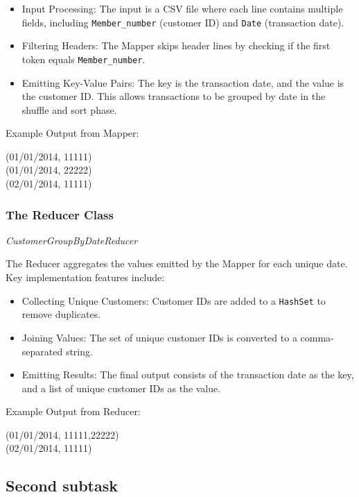 \begin{itemize}
    \item Input Processing: The input is a CSV file where each line contains multiple fields, including \texttt{Member\_number} (customer ID) and \texttt{Date} (transaction date).
    \item Filtering Headers: The Mapper skips header lines by checking if the first token equals \texttt{Member\_number}.
    \item Emitting Key-Value Pairs: The key is the transaction date, and the value is the customer ID.
    This allows transactions to be grouped by date in the shuffle and sort phase.
\end{itemize}

Example Output from Mapper:
\begin{center}
(01/01/2014, 11111)\\
(01/01/2014, 22222)\\
(02/01/2014, 11111)
\end{center}

\subsubsection{The Reducer Class} \textit{CustomerGroupByDateReducer}

The Reducer aggregates the values emitted by the Mapper for each unique date.
Key implementation features include:

\begin{itemize}
    \item Collecting Unique Customers: Customer IDs are added to a \texttt{HashSet} to remove duplicates.
    \item Joining Values: The set of unique customer IDs is converted to a comma-separated string.
    \item Emitting Results: The final output consists of the transaction date as the key, and a list of unique customer IDs as the value.
\end{itemize}

Example Output from Reducer:
\begin{center}
(01/01/2014, 11111,22222)\\
(02/01/2014, 11111)
\end{center}

\subsection{Second subtask}
\label{subsec:second-subtask}

